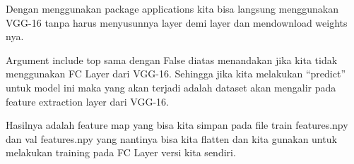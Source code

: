 Dengan menggunakan package applications kita bisa langsung menggunakan VGG-16 tanpa harus menyusunnya layer demi layer dan mendownload weights nya.

Argument include top sama dengan False diatas menandakan jika kita tidak menggunakan FC Layer dari VGG-16. Sehingga jika kita melakukan “predict” untuk model ini maka yang akan terjadi adalah dataset akan mengalir pada feature extraction layer dari VGG-16. 

Hasilnya adalah feature map yang bisa kita simpan pada file train features.npy dan val features.npy yang nantinya bisa kita flatten dan kita gunakan untuk melakukan training pada FC Layer versi kita sendiri.




